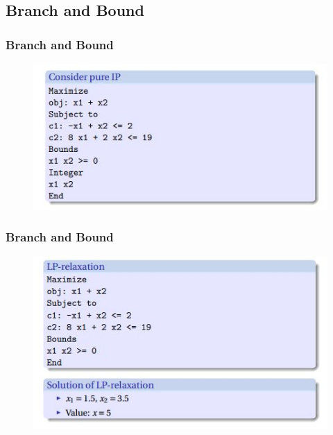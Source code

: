 \documentclass{beamer}
\begin{document}
\subsection{Branch and Bound}
\begin{frame}
	\frametitle{Branch and Bound}
	\Large
	\begin{figure}
		\centering
		\includegraphics[width=1.1\linewidth]{BranchBound1}
	\end{figure}
	
\end{frame}
\begin{frame}
	\frametitle{Branch and Bound}
	\Large
	\begin{figure}
		\centering
		\includegraphics[width=1.1\linewidth]{BranchBound2}
	\end{figure}
	
\end{frame}
\end{document}

